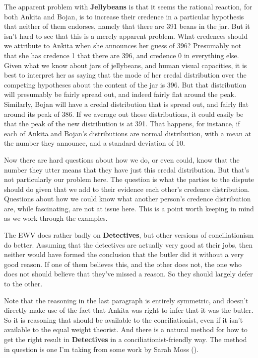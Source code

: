 \documentclass[
  10pt,
  letterpaper,
  twoside]{scrbook}
\begin{document}
The apparent problem with \textbf{Jellybeans} is that it seems the
rational reaction, for both {Ankita} and {Bojan}, is to increase their
credence in a particular hypothesis that neither of them endorses,
namely that there are 391 beans in the jar. But it isn't hard to see
that this is a merely apparent problem. What credences should we
attribute to {Ankita} when she announces her guess of 396? Presumably
not that she has credence 1 that there are 396, and credence 0 in
everything else. Given what we know about jars of jellybeans, and human
visual capacities, it is best to interpret her as saying that the mode
of her credal distribution over the competing hypotheses about the
content of the jar is 396. But that distribution will presumably be
fairly spread out, and indeed fairly flat around the peak. Similarly,
{Bojan} will have a credal distribution that is spread out, and fairly
flat around its peak of 386. If we average out those distributions, it
could easily be that the peak of the new distribution is at 391. That
happens, for instance, if each of {Ankita} and {Bojan}'s distributions
are normal distribution, with a mean at the number they announce, and a
standard deviation of 10.

Now there are hard questions about how we do, or even could, know that
the number they utter means that they have just this credal
distribution. But that's not particularly our problem here. The question
is what the parties to the dispute should do given that we add to their
evidence each other's credence distribution. Questions about how we
could know what another person's credence distribution are, while
fascinating, are not at issue here. This is a point worth keeping in
mind as we work through the examples.

The EWV does rather badly on \textbf{Detectives}, but other versions of
conciliationism do better. Assuming that the detectives are actually
very good at their jobs, then neither would have formed the conclusion
that the butler did it without a very good reason. If one of them
believes this, and the other does not, the one who does not should
believe that they've missed a reason. So they should largely defer to
the other.

Note that the reasoning in the last paragraph is entirely symmetric, and
doesn't directly make use of the fact that {Ankita} was right to infer
that it was the butler. So it is reasoning that should be available to
the conciliationist, even if it isn't available to the equal weight
theorist. And there is a natural method for how to get the right result
in \textbf{Detectives} in a conciliationist-friendly way. The method in
question is one I'm taking from some work by Sarah Moss
().
\end{document}
